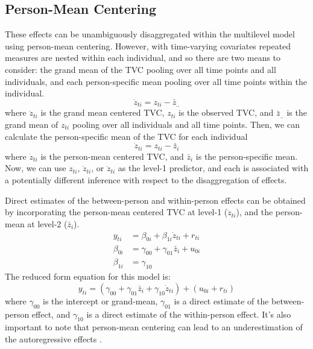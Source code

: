 \subsection{Person-Mean Centering}
These effects can be unambiguously disaggregated within the multilevel model using person-mean centering. However, with time-varying covariates repeated measures are nested within each individual, and so there are two means to consider: the grand mean of the TVC pooling over all time points and all individuals, and each person-specific mean pooling over all time points within the individual. 
\begin{equation}
    \ddot{z}_{ti} = z_{ti} - \bar{z}_{..}
\end{equation}
where $\ddot{z}_{ti}$ is the grand mean centered TVC, $z_{ti}$ is the observed TVC, and $\bar{z}_{..}$ is the grand mean of $z_{ti}$ pooling over all individuals and all time points. Then, we can calculate the person-specific mean of the TVC for each individual
\begin{equation}
    \dot{z}_{ti} = z_{ti} - \bar{z}_i
\end{equation}
where $\dot{z}_{ti}$ is the person-mean centered TVC, and $\bar{z}_i$ is the person-specific mean. Now, we can use $z_{ti}$, $\dot{z}_{ti}$, or $\ddot{z}_{ti}$ as the level-1 predictor, and each is associated with a potentially different inference with respect to the disaggregation of effects. 

Direct estimates of the between-person and within-person effects can be obtained by incorporating the person-mean centered TVC at level-1 ($\dot{z}_{ti}$), and the person-mean at level-2 ($\bar{z}_i$). 
\begin{equation}
    \begin{split}
        y_{ti} &= \beta_{0i} + \beta_{1i} \dot{z}_{ti} + r_{ti} \\
        \beta_{0i} &= \gamma_{00} + \gamma_{01} \bar{z}_i + u_{0i} \\
        \beta_{1i} &= \gamma_{10}
    \end{split}
\end{equation}
The reduced form equation for this model is:
\begin{equation}
    y_{ti} = (\gamma_{00} + \gamma_{01} \bar{z}_i + \gamma_{10} \dot{z}_{ti}) + (u_{0i} + r_{ti})
\end{equation}
where $\gamma_{00}$ is the intercept or grand-mean, $\gamma_{01}$ is a direct estimate of the between-person effect, and $\gamma_{10}$ is a direct estimate of the within-person effect. It's also important to note that person-mean centering can lead to an underestimation of the autoregressive effects \cite{hamaker2015center,bringmann2016assessing}.

